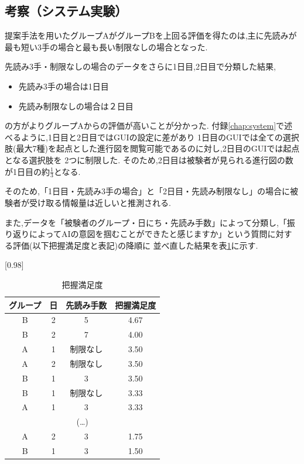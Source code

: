 \subsection{考察（システム実験）}


提案手法を用いたグループAがグループBを上回る評価を得たのは,主に先読みが最も短い3手の場合と最も長い制限なしの場合となった.

先読み3手・制限なしの場合のデータをさらに1日目,2日目で分類した結果,
\begin{itemize}
    \item 先読み3手の場合は1日目
    \item 先読み制限なしの場合は２日目
\end{itemize}

の方がよりグループAからの評価が高いことが分かった.
付録\ref{chap:system}で述べるように,1日目と2日目ではGUIの設定に差があり
1日目のGUIでは全ての選択肢(最大7種)を起点とした進行図を閲覧可能であるのに対し,2日目のGUIでは起点となる選択肢を
2つに制限した.
そのため,2日目は被験者が見られる進行図の数が1日目の約$\frac{1}{3}$となる.

そのため,「1日目・先読み3手の場合」と「2日目・先読み制限なし」の場合に被験者が受け取る情報量は近しいと推測される.

また,データを「被験者のグループ・日にち・先読み手数」によって分類し,「振り返りによってAIの意図を掴むことができたと感じますか」という質問に対する評価(以下把握満足度と表記)の降順に
並べ直した結果を表\ref{table:order}に示す.
\begin{table}[H]
	\caption{把握満足度}
    \label{table:order}
    \scriptsize
	\centering
	\scalebox{0.98}[0.98]{
		\begin{tabular}{c|c|c||c}
			グループ& 日 & 先読み手数 &把握満足度 \\ \hline
			B & 2 & 5 & 4.67\\
            B & 2 & 7 & 4.00\\
            A & 1 & 制限なし& 3.50\\
            A & 2 & 制限なし& 3.50\\
            B & 1 & 3& 3.50\\
            B & 1 & 制限なし& 3.33\\
            A & 1 & 3& 3.33\\
            \multicolumn{4}{c}{(\ldots)}\\
            A & 2 & 3 & 1.75\\
            B & 1 & 3 & 1.50\\

		\end{tabular}
	}
	
\end{table}

